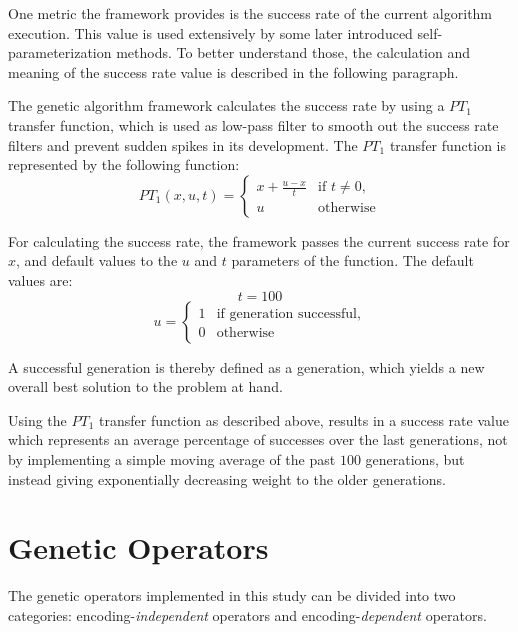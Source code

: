 \documentclass[english,examples]{isasthesis}
\begin{document}
One metric the framework provides is the success rate of the current algorithm
execution. This value is used extensively by some later introduced
self-parameterization methods. To better understand those, the calculation
and meaning of the success rate value is described in the following paragraph.

The genetic algorithm framework calculates the success rate by using a $PT_1$
transfer function, which is used as low-pass filter to smooth out the success
rate filters and prevent sudden spikes in its development. The $PT_1$ transfer
function is represented by the following function:
\begin{equation}
    PT_1(x, u, t) = \begin{cases}
        x + \frac{u - x}{t} & \text{if } t \neq 0, \\
        u                   & \text{otherwise}
    \end{cases}
\end{equation}

For calculating the success rate, the framework passes the current success
rate for $x$, and default values to the $u$ and $t$ parameters of the function.
The default values are:
\begin{equation}
    t = 100
\end{equation}
\begin{equation}
    u = \begin{cases}
        1   & \text{if generation successful}, \\
        0   & \text{otherwise}
    \end{cases}
\end{equation}

A successful generation is thereby defined as a generation, which yields
a new overall best solution to the problem at hand.

Using the $PT_1$ transfer function as described above, results in a success
rate value which represents an average percentage of successes over the last
generations, not by implementing a simple moving average of the past $100$
generations, but instead giving exponentially decreasing weight to the older
generations.


\section{Genetic Operators}
The genetic operators implemented in this study can be divided into two
categories: encoding-\textit{independent} operators and
encoding-\textit{dependent} operators.
\end{document}
